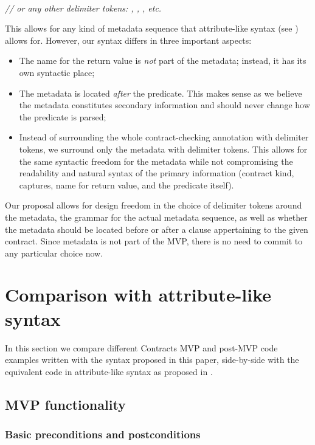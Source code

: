  \\
\phantom{~~~}\phantom{~~~~~}\emph{// or any other delimiter tokens: , , \tcode{[[...]]}, etc.}

This allows for any kind of metadata sequence that attribute-like syntax (see \cite{P2935R0}) allows for. However, our syntax differs in three important aspects:

\begin{itemize}
\item The name for the return value is \emph{not} part of the metadata; instead, it has its own syntactic place;
\item The metadata is located \emph{after} the predicate. This makes sense as we believe the metadata constitutes secondary information and should never change how the predicate is parsed;
\item Instead of surrounding the whole contract-checking annotation with delimiter tokens, we surround only the metadata with delimiter tokens. This allows for the same syntactic freedom for the metadata while not compromising the readability and natural syntax of the primary information (contract kind, captures, name for return value, and the predicate itself).
\end{itemize}

Our proposal allows for design freedom in the choice of delimiter tokens around the metadata, the grammar for the actual metadata sequence, as well as whether the metadata should be located before or after a  clause appertaining to the given contract. Since metadata is not part of the MVP, there is no need to commit to any particular choice now.

\section{Comparison with attribute-like syntax}

In this section we compare different Contracts MVP and post-MVP code examples written with the syntax proposed in this paper, side-by-side with the equivalent code in attribute-like syntax as proposed in \cite{P2935R0}.

\subsection{MVP functionality}

\subsubsection{Basic preconditions and postconditions}

